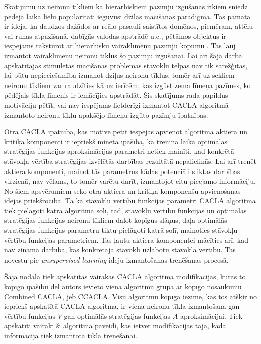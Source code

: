 \documentclass{ludis} %
\begin{document}
Skatījumu uz neironu tīkliem kā hierarhiskiem pazīmju izgūšanas rīkiem sniedz
pēdējā laikā lielu popularitāti ieguvusī dziļās mācīšanās paradigma. Tās pamatā
ir ideja, ka daudzos dažādos ar reālo pasauli saistītos domēnos, piemēram, attēlu
vai runas atpazīšanā, dabīgās valodas apstrādē u.c., pētāmos objektus ir
iespējams raksturot ar hierarhisku vairāklīmeņu pazīmju kopumu \autocite{Lecun2015}. Tas ļauj
izmantot vairāklīmeņu neironu tīklus šo pazīmju izgūšanai. %
Lai arī šajā darbā apskatītajās stimulētās mācīšanās problēmas stāvokļu telpas
nav tik sarežģītas, lai būtu nepieciešamība izmanot dziļus neironu tīklus, tomēr
arī uz sekliem neironu tīkliem var raudzīties kā uz ierīcēm, kas izgūst zema
līmeņa pazīmes, ko pēdējais tīkla līmenis ir iemācījies apstrādāt. Šis skatījums
rada papildus motivāciju pētīt, vai nav iespējams lietderīgi izmantot CACLA
algoritmā izmantoto neironu tīklu apakšējo līmeņu izgūto pazīmju īpatnības.

Otra CACLA īpatnība, kas motivē pētīt iespējas apvienot algoritma aktiera un
kritiķa komponenti ir iepriekš minētā īpašība, ka treniņa laikā optimālās
stratēģijas funkcijas aproksimācijas parametri netiek mainīti, kad konkrētā
stāvokļa vērtība stratēģijas izvēlētās darbības rezultātā nepalielinās. Lai arī
trenēt aktiera komponenti, mainot tās parametrus kādas potenciāli sliktas
darbības virzienā, nav vēlams, to tomēr varētu darīt, izmantojot citu
pieejamo informāciju. No šiem apsvērumiem seko otra aktiera un kritiķa
komponenšu apvienošanas idejas priekšrocība. Tā kā stāvokļu vērtību funkcijas
parametri CACLA algoritmā tiek pielāgoti katrā algoritma solī, tad, stāvokļu
vērtību funkcijas un optimālās stratēģijas funkcijas neironu tīkliem dalot
kopīgus slāņus, daļa optimālās stratēģijas funkcijas parametru tiktu pielāgoti
katrā solī, mainoties stāvokļu vērtību funkcijas parametriem. Tas ļautu aktiera
komponentei mācīties arī, kad nav zināma darbība, kas konkrētajā stāvoklī
uzlabotu stāvokļa vērtību. Tas novestu pie \textit{unsupervised learning} ideju
izmantošanas trenēšanas procesā. %

Šajā nodaļā tiek apskatītas vairākas CACLA algoritma modifikācijas, kuras to
kopīgo īpašību dēļ autors ievieto vienā algoritmu grupā ar kopīgo nosaukumu
Combined CACLA, jeb CCACLA. Visu algoritmu kopīgā iezīme, kas tos atšķir no
iepriekš apskatītā CACLA algoritma, ir viena neironu tīkla izmantošana gan
vērtību funkcijas $V$ gan optimālās stratēģijas funkcijas $A$ aproksimācijai.
Tiek apskatīti vairāki šī algoritma paveidi, kas ietver modifikācijas tajā, kāda
informācija tiek izmantota tīkla trenēšanai.
\end{document}
